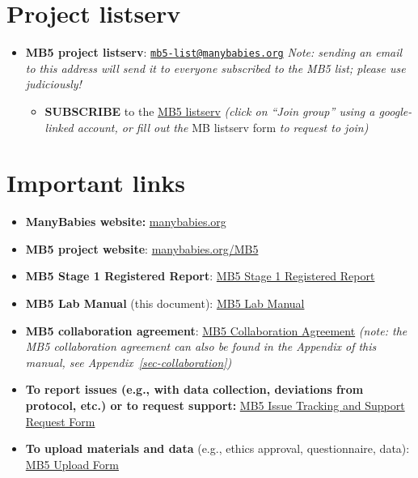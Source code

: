 \documentclass[
  letterpaper,
  DIV=11,
  numbers=noendperiod,
  oneside]{scrreprt}
\providecommand{\tightlist}{%
  \setlength{\itemsep}{0pt}\setlength{\parskip}{0pt}}
\begin{document}
\section*{Project listserv}\label{project-listserv}


\begin{itemize}
\item
  \textbf{MB5 project listserv}:
  \href{mailto:mb5-list@manybabies.org}{\nolinkurl{mb5-list@manybabies.org}}
  \emph{Note: sending an email to this address will send it to everyone
  subscribed to the MB5 list; please use judiciously!}

  \begin{itemize}
  \tightlist
  \item
    \textbf{SUBSCRIBE} to the
    \href{https://groups.google.com/a/manybabies.org/g/mb5-list}{MB5
    listserv} \emph{(click on ``Join group'' using a google-linked
    account, or fill out the} MB listserv form \emph{to request to
    join)}
  \end{itemize}
\end{itemize}

\section*{Important links}\label{important-links}


\begin{itemize}
\item
  \textbf{ManyBabies website:}
  \href{https://manybabies.org/}{manybabies.org}
\item
  \textbf{MB5 project website}:
  \href{https://manybabies.org/MB5/}{manybabies.org/MB5}
\item
  \textbf{MB5 Stage 1 Registered Report}:
  \href{https://doi.org/10.31234/osf.io/ck3vd}{MB5 Stage 1 Registered
  Report}
\item
  \textbf{MB5 Lab Manual} (this document):
  \href{https://manybabies.org/mb5-manual}{MB5 Lab Manual}
\item
  \textbf{MB5 collaboration agreement}:
  \href{https://docs.google.com/document/d/1vbTDmH6euda5pJN4uyds3zsnQ1DXrW9wpHogwC-5TSk/edit?usp=sharing}{MB5
  Collaboration Agreement} \emph{(note: the MB5 collaboration agreement
  can also be found in the Appendix of this manual, see
  Appendix~\ref{sec-collaboration})}
\item
  \textbf{To report issues (e.g., with data collection, deviations from
  protocol, etc.) or to request support:}
  \href{https://airtable.com/appRoqMKzcK3NsXt4/pagGafhoHcuVMs7ZV/form}{MB5
  Issue Tracking and Support Request Form}
\item
  \textbf{To upload materials and data} (e.g., ethics approval,
  questionnaire, data):
  \href{https://airtable.com/appRoqMKzcK3NsXt4/pagPm3MXnFExsz1Ti/form}{MB5
  Upload Form}
\end{itemize}
\end{document}

